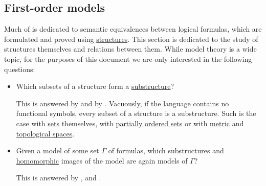 \subsection{First-order models}\label{subsec:first_order_models}

Much of  is dedicated to semantic equivalences between logical formulas, which are formulated and proved using \hyperref[def:first_order_structure]{structures}. This section is dedicated to the study of structures themselves and relations between them. While model theory is a wide topic, for the purposes of this document we are only interested in the following questions:

\begin{itemize}
  \item Which subsets of a structure form a \hyperref[def:first_order_substructure]{substructure}?

  This is answered by  and by . Vacuously, if the language contains no functional symbols, every subset of a structure is a substructure. Such is the case with \hyperref[def:set_zfc]{sets} themselves, with \hyperref[def:poset]{partially ordered sets} or with \hyperref[def:metric_space]{metric} and \hyperref[def:topological_space]{topological spaces}.

  \item Given a model of some set \( \Gamma \) of formulas, which substructures and \hyperref[def:first_order_homomorphism]{homomorphic} images of the model are again models of \( \Gamma \)?

  This is answered by ,  and .
\end{itemize}


